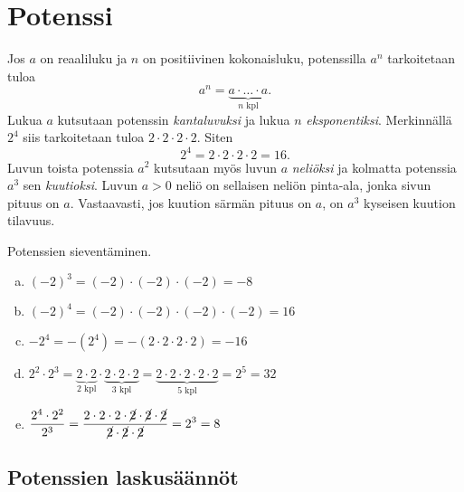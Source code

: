 \section{Potenssi}
    
    Jos $a$ on reaaliluku ja $n$ on positiivinen kokonaisluku, potenssilla $a^n$ tarkoitetaan tuloa
    \[
        a^n = \underbrace{a\cdot \ldots \cdot a}_{n\text{ kpl}}. 
    \]
Lukua $a$ kutsutaan potenssin \emph{kantaluvuksi} ja lukua $n$ \emph{eksponentiksi}. Merkinnällä $2^4$ siis tarkoitetaan tuloa $2\cdot 2\cdot 2\cdot 2$. Siten
        \[
            2^4=2\cdot 2\cdot 2\cdot 2=16.
        \]
Luvun toista potenssia $a^2$ kutsutaan myös luvun $a$ \emph{neliöksi} ja kolmatta potenssia $a^3$ sen \emph{kuutioksi}. Luvun $a>0$ neliö on sellaisen neliön pinta-ala, jonka sivun pituus on $a$. Vastaavasti, jos kuution särmän pituus on $a$, on $a^3$ kyseisen kuution tilavuus.  
            
    \begin{esimerkki}
        Potenssien sieventäminen.
        \begin{enumerate}[a)]
            \item $(-2)^3 = (-2)\cdot (-2)\cdot (-2) = -8$
            \item $(-2)^4 = (-2)\cdot (-2)\cdot (-2)\cdot (-2) = 16$
            \item $-2^4   = -(2^4) = -(2\cdot 2\cdot 2\cdot 2) = -16$
            \item $2^2\cdot 2^3 =
                \underbrace{2\cdot 2}_{\text{$2$ kpl}}\cdot \underbrace{2\cdot
                2\cdot 2}_{\text{$3$ kpl}} = \underbrace{2\cdot 2\cdot 2\cdot 2\cdot 2}_{\text{$5$ kpl}}=2^5 = 32$
            \item $\displaystyle\frac{2^4\cdot 2^2}{2^3} =
                \frac{2\cdot 2\cdot 2\cdot \cancel{2} \cdot \cancel{2}\cdot
                \cancel{2}}{\cancel{2}\cdot \cancel{2}\cdot \cancel{2}} = 2^3 = 8$
        \end{enumerate}
    \end{esimerkki}
    
\subsection*{Potenssien laskusäännöt}
    
